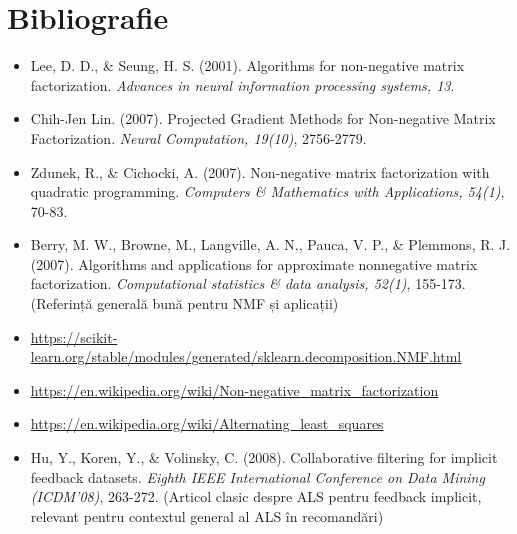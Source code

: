 \documentclass[12pt,a4paper]{article}
\begin{document}
	\section{Bibliografie}
	\begin{itemize}
		\item Lee, D. D., \& Seung, H. S. (2001). Algorithms for non-negative matrix factorization. \textit{Advances in neural information processing systems, 13}.
		\item Chih-Jen Lin. (2007). Projected Gradient Methods for Non-negative Matrix Factorization. \textit{Neural Computation, 19(10)}, 2756-2779.
		\item Zdunek, R., \& Cichocki, A. (2007). Non-negative matrix factorization with quadratic programming. \textit{Computers \& Mathematics with Applications, 54(1)}, 70-83.
		\item Berry, M. W., Browne, M., Langville, A. N., Pauca, V. P., \& Plemmons, R. J. (2007). Algorithms and applications for approximate nonnegative matrix factorization. \textit{Computational statistics \& data analysis, 52(1)}, 155-173. (Referință generală bună pentru NMF și aplicații)
		\item \url{https://scikit-learn.org/stable/modules/generated/sklearn.decomposition.NMF.html}
		\item \url{https://en.wikipedia.org/wiki/Non-negative_matrix_factorization}
		\item \url{https://en.wikipedia.org/wiki/Alternating_least_squares}
		\item Hu, Y., Koren, Y., \& Volinsky, C. (2008). Collaborative filtering for implicit feedback datasets. \textit{Eighth IEEE International Conference on Data Mining (ICDM'08)}, 263-272. (Articol clasic despre ALS pentru feedback implicit, relevant pentru contextul general al ALS în recomandări)
	\end{itemize}
\end{document}
